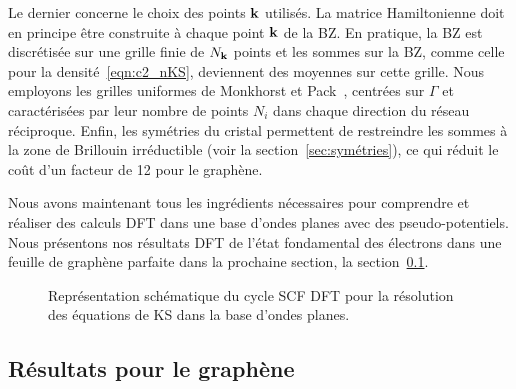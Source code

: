 \bigskip
{}

Le dernier concerne le choix des points $\mathbf{k}$ utilisés. La matrice Hamiltonienne doit en principe être construite à chaque point $\mathbf{k}$ de la BZ. En pratique, la BZ est discrétisée sur une grille finie de $N_{\mathbf{k}}$ points et les sommes sur la BZ, comme celle pour la densité~\eqref{eqn:c2_nKS}, deviennent des moyennes sur cette grille. Nous employons les grilles uniformes de Monkhorst et Pack~\cite{monkhorstSpecialPointsBrillouinzone1976}, centrées sur $\Gamma$ et caractérisées par leur nombre de points $N_i$ dans chaque direction du réseau réciproque. Enfin, les symétries du cristal permettent de restreindre les sommes à la zone de Brillouin irréductible (voir la section~\ref{sec:symétries}), ce qui réduit le coût d'un facteur de 12 pour le graphène.

Nous avons maintenant tous les ingrédients nécessaires pour comprendre et réaliser des calculs DFT dans une base d'ondes planes avec des pseudo-potentiels. Nous présentons nos résultats DFT de l'état fondamental des électrons dans une feuille de graphène parfaite dans la prochaine section, la section~\ref{sec:electron_results}.
\clearpage

\vspace*{\fill}
\begin{figure}[H]
    \centering
    \hspace{2.5cm}
    
    \caption[Représentation schématique du cycle SCF DFT pour la résolution des équations de KS dans la base d'ondes planes.]{Représentation schématique du cycle SCF DFT pour la résolution des équations de KS dans la base d'ondes planes.}
    \label{fig:scf_PW}
\end{figure}
\vspace*{\fill}
\subsection{Résultats pour le graphène}\label{sec:electron_results}

